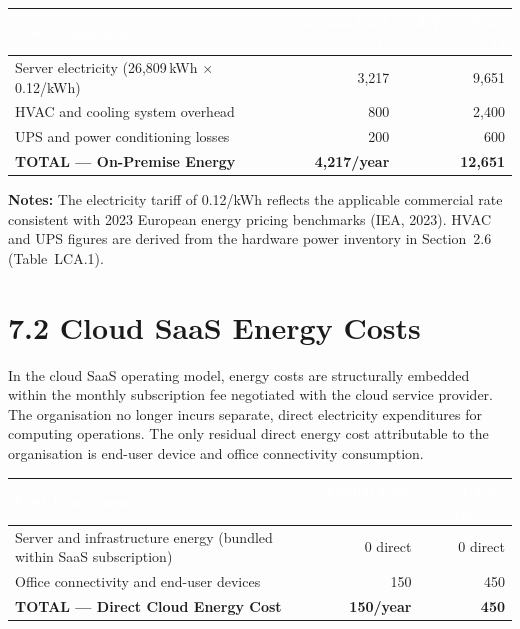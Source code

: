 \vspace{0.5em}
\begin{tabularx}{\textwidth}{X r r}
\toprule
\rowcolor{headerrow}
\textcolor{white}{\textbf{Cost Component}} &
\textcolor{white}{\textbf{Annual Cost (\texteuro{})}} &
\textcolor{white}{\textbf{3-Year Total (\texteuro{})}} \\
\midrule
\rowcolor{rowalt}
  Server electricity (26{,}809\,kWh $\times$ \texteuro{}0.12/kWh)
  & \texteuro{}3{,}217 & \texteuro{}9{,}651 \\
  HVAC and cooling system overhead
  & \texteuro{}800    & \texteuro{}2{,}400 \\
\rowcolor{rowalt}
  UPS and power conditioning losses
  & \texteuro{}200    & \texteuro{}600 \\
\midrule
\rowcolor{palegreen}
  \textbf{TOTAL --- On-Premise Energy}
  & \textbf{\texteuro{}4{,}217/year} & \textbf{\texteuro{}12{,}651} \\
\bottomrule
\end{tabularx}

\vspace{0.5em}
\textbf{Notes:} The electricity tariff of \texteuro{}0.12/kWh reflects the
applicable commercial rate consistent with 2023 European energy pricing
benchmarks (IEA, 2023). HVAC and UPS figures are derived from the hardware
power inventory in Section~2.6 (Table~LCA.1).

\section{7.2 Cloud SaaS Energy Costs}

In the cloud SaaS operating model, energy costs are structurally embedded
within the monthly subscription fee negotiated with the cloud service
provider. The organisation no longer incurs separate, direct electricity
expenditures for computing operations. The only residual direct energy cost
attributable to the organisation is end-user device and office connectivity
consumption.

\vspace{0.5em}
\begin{tabularx}{\textwidth}{X r r}
\toprule
\rowcolor{headerrow}
\textcolor{white}{\textbf{Cost Component}} &
\textcolor{white}{\textbf{Annual Cost (\texteuro{})}} &
\textcolor{white}{\textbf{3-Year Total (\texteuro{})}} \\
\midrule
\rowcolor{rowalt}
  Server and infrastructure energy (bundled within SaaS subscription)
  & \texteuro{}0 direct & \texteuro{}0 direct \\
  Office connectivity and end-user devices
  & \texteuro{}150 & \texteuro{}450 \\
\midrule
\rowcolor{palegreen}
  \textbf{TOTAL --- Direct Cloud Energy Cost}
  & \textbf{\texteuro{}150/year} & \textbf{\texteuro{}450} \\
\bottomrule
\end{tabularx}

